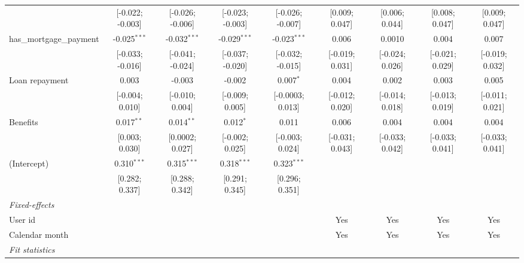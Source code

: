 \begin{table}[htbp]
\begin{threeparttable}[b]
\begin{tabular}{lcccccccc}
                                  & [-0.022; -0.003] & [-0.026; -0.006]  & [-0.023; -0.003] & [-0.026; -0.007] & [0.009; 0.047]  & [0.006; 0.044]  & [0.008; 0.047]  & [0.009; 0.047]\\   
         has\_mortgage\_payment   & -0.025$^{***}$   & -0.032$^{***}$    & -0.029$^{***}$   & -0.023$^{***}$   & 0.006           & 0.0010          & 0.004           & 0.007\\   
                                  & [-0.033; -0.016] & [-0.041; -0.024]  & [-0.037; -0.020] & [-0.032; -0.015] & [-0.019; 0.031] & [-0.024; 0.026] & [-0.021; 0.029] & [-0.019; 0.032]\\   
         Loan repayment           & 0.003            & -0.003            & -0.002           & 0.007$^{*}$      & 0.004           & 0.002           & 0.003           & 0.005\\   
                                  & [-0.004; 0.010]  & [-0.010; 0.004]   & [-0.009; 0.005]  & [-0.0003; 0.013] & [-0.012; 0.020] & [-0.014; 0.018] & [-0.013; 0.019] & [-0.011; 0.021]\\   
         Benefits                 & 0.017$^{**}$     & 0.014$^{**}$      & 0.012$^{*}$      & 0.011            & 0.006           & 0.004           & 0.004           & 0.004\\   
                                  & [0.003; 0.030]   & [0.0002; 0.027]   & [-0.002; 0.025]  & [-0.003; 0.024]  & [-0.031; 0.043] & [-0.033; 0.042] & [-0.033; 0.041] & [-0.033; 0.041]\\   
         (Intercept)              & 0.310$^{***}$    & 0.315$^{***}$     & 0.318$^{***}$    & 0.323$^{***}$    &                 &                 &                 &   \\   
                                  & [0.282; 0.337]   & [0.288; 0.342]    & [0.291; 0.345]   & [0.296; 0.351]   &                 &                 &                 &   \\   
         \midrule
         \emph{Fixed-effects}\\
         User id                  &                  &                   &                  &                  & Yes             & Yes             & Yes             & Yes\\  
         Calendar month           &                  &                   &                  &                  & Yes             & Yes             & Yes             & Yes\\  
         \midrule
         \emph{Fit statistics}\\

\end{tabular}
\end{threeparttable}
\end{table}
